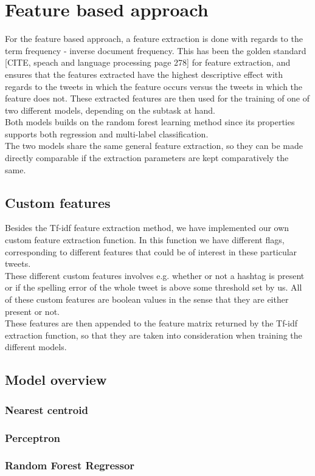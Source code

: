 
\section{Feature based approach}

For the feature based approach, a feature extraction is done with regards to the term frequency - inverse document frequency. This has been the golden standard [CITE, speach and language processing page 278] for feature extraction, and ensures that the features extracted have the highest descriptive effect with regards to the tweets in which the feature occurs versus the tweets in which the feature does not. These extracted features are then used for the training of one of two different models, depending on the subtask at hand.\\
Both models builds on the random forest learning method since its properties supports both regression and multi-label classification. \\
The two models share the same general feature extraction, so they can be made directly comparable if the extraction parameters are kept comparatively the same.
\subsection{Custom features}
Besides the Tf-idf feature extraction method, we have implemented our own custom feature extraction function. In this function we have different flags, corresponding to different features that could be of interest in these particular tweets. \\
These different custom features involves e.g. whether or not a hashtag is present or if the spelling error of the whole tweet is above some threshold set by us. All of these custom features are boolean values in the sense that they are either present or not. \\
These features are then appended to the feature matrix returned by the Tf-idf extraction function, so that they are taken into consideration when training the different models.
\subsection{Model overview}
\subsubsection{Nearest centroid}
\subsubsection{Perceptron}
\subsubsection{Random Forest Regressor}